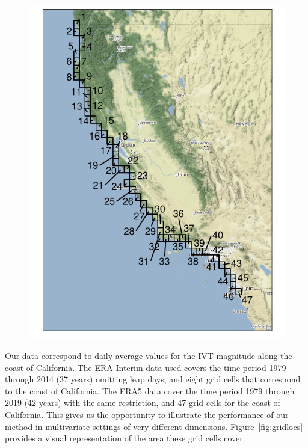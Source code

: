 \begin{figure}[tb]
\begin{minipage}{0.25\textwidth}
    \includegraphics[width=0.99\linewidth]{./images/era5_grid}
    \end{minipage}  
\end{figure}

Our data correspond to daily average values for the IVT magnitude
    along the coast of California.  The ERA-Interim data used covers the time period 
    1979 through 2014 (37 years) omitting leap days, and eight grid cells that 
    correspond to the coast of California.  The ERA5 data cover the time period 
    1979 through 2019 (42 years) with the same restriction, and  47 grid cells for 
    the coast of California.  This gives us the opportunity to illustrate the 
    performance of our method in multivariate settings of very different dimensions. 
    Figure~\ref{fig:gridlocs} provides a visual representation of the area these grid 
    cells cover.

